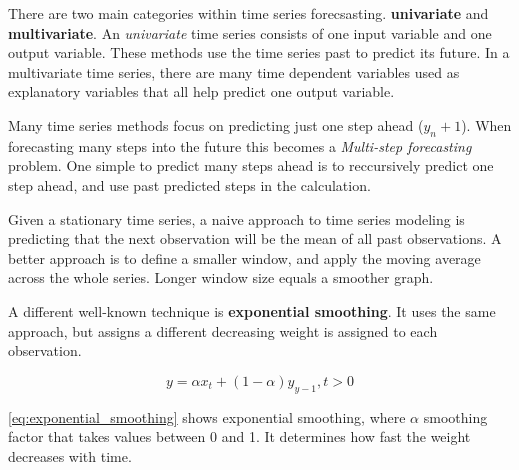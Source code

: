 There are two main categories within time series forecsasting. \textbf{univariate} and \textbf{multivariate}. 
An \textit{univariate} time series consists of one input variable and one output variable. These methods use the time series past to predict its future.
In a multivariate time series, there are many time dependent variables used as explanatory variables that all help predict one output variable.


Many time series methods focus on predicting just one step ahead ($y_n+1$). When forecasting many steps into the future this becomes a 
\textit{Multi-step forecasting} problem. One simple to predict many steps ahead is to reccursively predict one step ahead, and use past predicted steps 
in the calculation.


Given a stationary time series, a naive approach to time series modeling is predicting that the next observation will be the
mean of all past observations. A better approach is to define a smaller window, and
apply the moving average across the whole series. Longer window size equals a smoother graph.

A different well-known technique is \textbf{exponential smoothing}. It uses the same approach,
but assigns a different decreasing weight is assigned to each observation.

\begin{equation}
    \label{eq:exponential_smoothing}
    y = \alpha x_t + (1 - \alpha)y_{y-1}, t > 0
\end{equation}

\autoref{eq:exponential_smoothing}
shows exponential smoothing, where $\alpha$ smoothing factor
that takes values between 0 and 1. It determines how fast the weight decreases with time.





